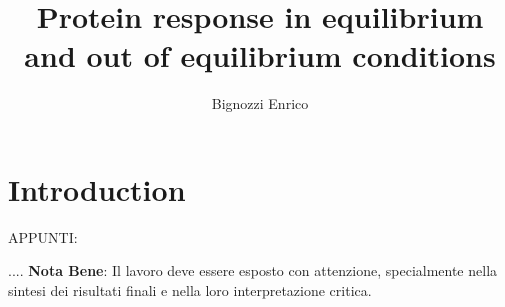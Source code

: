 \documentclass[English, Lau, oneside]{sapthesis}
\title{Protein response in equilibrium and out of equilibrium conditions}
\author{Bignozzi Enrico}
\begin{document}
\maketitle

\tableofcontents



    

\dedication{}

\newpage
\null
\thispagestyle{empty}
\newpage




\newpage
\null
\thispagestyle{empty}
\newpage



\chapter{Introduction}
\noindent
APPUNTI:


....
\vspace{1cm}
\noindent \textbf{Nota Bene}: Il lavoro deve essere esposto con attenzione, specialmente nella sintesi dei risultati finali e nella loro interpretazione critica.
\end{document}
